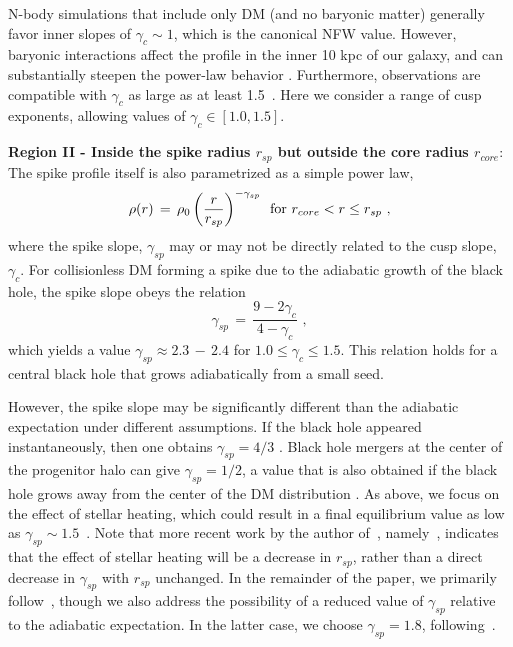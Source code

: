\documentclass[11pt]{article}
\newcommand{\be}{\begin{equation}}
\newcommand{\ee}{\end{equation}}
\begin{document}
N-body simulations that include only DM (and no baryonic matter) generally favor inner slopes of $\gamma_c \sim 1$, which is the canonical NFW value. However, baryonic interactions affect the profile in the inner 10 kpc of our galaxy, and can substantially steepen the power-law behavior \cite{Diemand:2008in, Navarro:2008kc, Gnedin:2004cx, Gustafsson:2006gr, Pato:2015dua}. 
Furthermore, observations are compatible with $\gamma_c$ as large as at least 1.5~\cite{Pato:2015dua}.
Here we consider a range of cusp exponents, allowing values of $\gamma_c\in [1.0,1.5]$.


\textbf{Region II - Inside the spike radius $r_{sp}$ but outside the core radius $r_{core}$}:  The spike profile itself is also parametrized as a simple power law,  
%
\be \label{densityii}
\rho (r) \, = \, \rho_0 \left(\frac{r}{r_{sp}}\right)^{-\gamma_{sp}}\,\,\,{\rm for}\,\, r_{core} < r \leq r_{sp} \,\,,
\ee
%
where the spike slope, $\gamma_{sp}$ may or may not be directly related to the cusp slope, $\gamma_c$. For collisionless DM forming a spike due to the adiabatic growth of the black hole, the spike slope obeys the relation 
%
\be
\gamma_{sp} \, = \, \frac{9-2 \gamma_c}{4 - \gamma_c} \,\,,
\label{gammaspeq}
\ee
%
which yields a value $\gamma_{sp} \approx 2.3 \, - \, 2.4$ for $1.0 \leq \gamma_c \leq 1.5$.  This relation holds for a central black hole that grows adiabatically from a small seed. 

However, the spike slope may be significantly different than the adiabatic expectation under different assumptions. If the black hole appeared instantaneously, then one obtains $\gamma_{sp} = 4/3$ \cite{Ullio:2001fb}. Black hole mergers at the center of the progenitor halo can give $\gamma_{sp} = 1/2$, a value that is also obtained if the black hole grows away from the center of the DM distribution \cite{Ullio:2001fb}. As above, we focus on the effect of stellar heating, which could result in a final equilibrium value as low as $\gamma_{sp} \sim 1.5$~\cite{Merritt:2003qk, Gnedin:2003rj}.
Note that more recent work by the author of~\cite{Merritt:2003qk}, namely~\cite{Ahn:2007ty}, indicates that the effect of stellar heating will be a decrease in $r_{sp}$, rather than a direct decrease in $\gamma_{sp}$ with $r_{sp}$ unchanged.  In the remainder of the paper, we primarily follow~\cite{Ahn:2007ty}, though we also address the possibility of a reduced value of $\gamma_{sp}$ relative to the adiabatic expectation.  In the latter case, we choose $\gamma_{sp}=1.8$, following~\cite{Fields:2014pia}.
\end{document}
